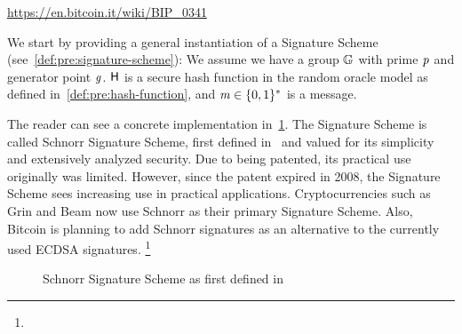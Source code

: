 \urldef\urlbiptaproot\url{https://en.bitcoin.it/wiki/BIP_0341}

We start by providing a general instantiation of a Signature Scheme (see~\cref{def:pre:signature-scheme}):
We assume we have a group $\mathbb{G}$ with prime $\mathit{p}$ and generator point $\mathit{g}$.
$\mathsf{H}$ is a secure hash function in the random oracle model as defined in~\cref{def:pre:hash-function}, and $\mathit{m} \in \{0,1\}^{*}$ is a message.


The reader can see a concrete implementation in~\cref{fig:schnorr}.
The Signature Scheme is called Schnorr Signature Scheme, first defined in~\cite{schnorr1989efficient} and valued for its simplicity and extensively analyzed security.
Due to being patented, its practical use originally was limited.
However, since the patent expired in 2008, the Signature Scheme sees increasing use in practical applications.
Cryptocurrencies such as Grin and Beam now use Schnorr as their primary Signature Scheme.
Also, Bitcoin is planning to add Schnorr signatures as an alternative to the currently used ECDSA signatures. \footnote{\urlbiptaproot}
\begin{figure}
    \begin{center}
        \fbox{
        \begin{varwidth}{\textwidth}
            \procedure[linenumbering]{$\procSetup{\varSecParam}$} {
            \varKey \sample \cnstIntegersPrimeWithoutZero{\varPrime} \\
            \pcreturn (\varSecKey \opAssign \varKey \opSeperate \varPubKey \opAssign \funGen{\varKey})
            }
            \procedure[linenumbering]{$\procSign{\varMsg}{\varSecKey}$}{
            \varNonce \sample \cnstIntegersPrimeWithoutZero{\varPrime} \\
            \varRand \opAssign \funGen{\varNonce} \\
            \varSchnorrChallenge \opAssign \funHash{\varMsg \opConc \varRand \opConc \varPubKey} \\
            \varS \opAssign \varNonce \opAddScalar \varSchnorrChallenge \opTimesScalar \varSecKey \\
            \pcreturn \varSignature \opAssign (\varS, \varRand)
            }
            \procedure[linenumbering]{$\procVerf{\varMsg}{\varSignature}{\varPubKey}$} {
            (\varS \opSeperate \varRand) \opFunResult \varSignature \\
            \varSchnorrChallenge \opAssign \funHash{\varMsg \opConc \varRand \opConc \varPubKey} \\
            \pcreturn \funGen{\varS} \opEqNoQ \varRand \opAddPoint \opPointScalar{\varPubKey}{\varSchnorrChallenge}
            }
        \end{varwidth}
        }
    \end{center}
    \caption{Schnorr Signature Scheme as first defined in~\cite{schnorr1989efficient}}
    \label{fig:schnorr}
\end{figure}


